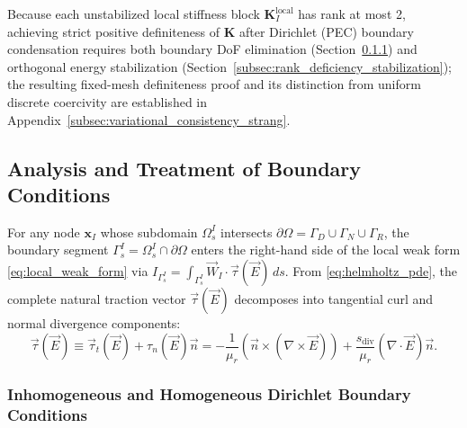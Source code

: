 \documentclass[VANCOUVER,Times1COL]{WileyNJD-v5}
\begin{document}
Because each unstabilized local stiffness block $\mathbf{K}_I^{\mathrm{local}}$ has rank at most 2, achieving strict positive definiteness of $\mathbf{K}$ after Dirichlet (PEC) boundary condensation requires both boundary DoF elimination (Section~\ref{subsubsec:dirichlet_bc}) and orthogonal energy stabilization (Section~\ref{subsec:rank_deficiency_stabilization}); the resulting fixed-mesh definiteness proof and its distinction from uniform discrete coercivity are established in Appendix~\ref{subsec:variational_consistency_strang}.

\subsection{Analysis and Treatment of Boundary Conditions}
\label{subsec:boundary_treatment}

For any node $\mathbf{x}_I$ whose subdomain $\Omega_s^I$ intersects $\partial\Omega = \Gamma_D \cup \Gamma_N \cup \Gamma_R$, the boundary segment $\Gamma_s^I = \Omega_s^I \cap \partial\Omega$ enters the right-hand side of the local weak form \eqref{eq:local_weak_form} via $I_{\Gamma_s^I} = \int_{\Gamma_s^I} \vec{W}_I \cdot \vec{\tau}(\vec{E}) \, ds$. From \eqref{eq:helmholtz_pde}, the complete natural traction vector $\vec{\tau}(\vec{E})$ decomposes into tangential curl and normal divergence components:
\begin{equation}
    \vec{\tau}(\vec{E}) \equiv \vec{\tau}_t(\vec{E}) + \tau_n(\vec{E})\vec{n} = -\frac{1}{\mu_r} \left( \vec{n} \times (\nabla \times \vec{E}) \right) + \frac{s_{\mathrm{div}}}{\mu_r} (\nabla \cdot \vec{E}) \vec{n}.
    \label{eq:traction_vector}
\end{equation}

\subsubsection{Inhomogeneous and Homogeneous Dirichlet Boundary Conditions}
\label{subsubsec:dirichlet_bc}
\end{document}
